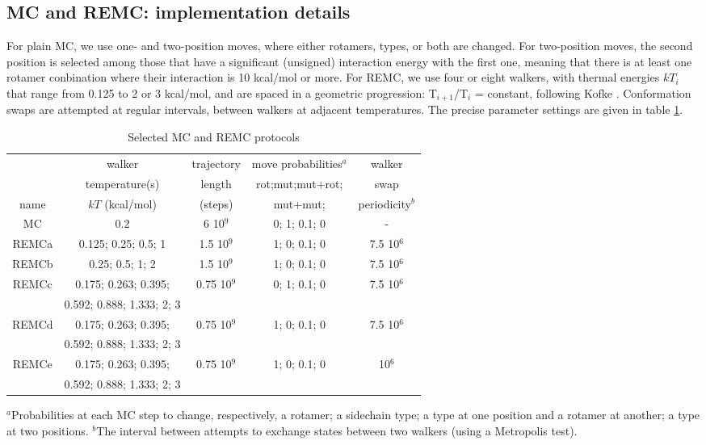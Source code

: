 \subsection{MC and REMC: implementation details}
\label{sub:REMCdetails}
For plain MC, we use one- and two-position moves, where either rotamers, types, or both are changed.
For two-position moves, the second position is selected among those that have a significant (unsigned) interaction energy with the first one, meaning that there is at least one rotamer conbination where their interaction is 10 kcal/mol or more.
For REMC, we use four or eight walkers, with thermal energies $kT_i$ that range from 0.125
to 2 or 3 kcal/mol, and are spaced in a geometric progression: T$_{i+1}$/T$_i$ = constant, following Kofke \cite{Kofke02}.
Conformation swaps are attempted at regular intervals, between walkers at adjacent temperatures.
The precise parameter settings are given in table \ref{tab:parameters}.

\begin{table}[H]                            
\caption{Selected MC and REMC protocols}
\label{tab:parameters}                      
\begin{center} \small 
\renewcommand{\arraystretch}{0.75}
\begin{tabular}{ccccc} \hline \hline  
      &  walker                   & trajectory & move probabilities$^a$ & walker     \\ 
      &  temperature(s)           & length     & rot;mut;mut+rot; & swap       \\ 
name  & $kT$ (kcal/mol)           & (steps)    & mut+mut;         & periodicity$^b$ \smallskip \\  \hline 
MC    & 0.2                       &   6 10$^9$ & 0; 1; 0.1; 0     &  -          \smallskip \\      
REMCa & 0.125; 0.25; 0.5; 1       & 1.5 10$^9$ & 1; 0; 0.1; 0     & 7.5 10$^6$  \smallskip \\   
REMCb & 0.25; 0.5; 1; 2           & 1.5 10$^9$ & 1; 0; 0.1; 0     & 7.5 10$^6$  \smallskip \\ 
REMCc & 0.175; 0.263; 0.395;      & 0.75 10$^9$& 0; 1; 0.1; 0     & 7.5 10$^6$  \\
      & 0.592; 0.888; 1.333; 2; 3 &  &  &  \smallskip \\
REMCd & 0.175; 0.263; 0.395;      &0.75 10$^9$ & 1; 0; 0.1; 0     & 7.5 10$^6$  \\
      & 0.592; 0.888; 1.333; 2; 3 &  &  &  \smallskip \\
REMCe & 0.175; 0.263; 0.395;      &0.75 10$^9$ & 1; 0; 0.1; 0     &     10$^6$  \\ 
      & 0.592; 0.888; 1.333; 2; 3  &  &  &  \smallskip \\ \hline
\end{tabular}
\end{center}
{\small \noindent $^a$Probabilities at each MC step to change, respectively, a rotamer; a sidechain type; a type at one position and a rotamer at another;
a type at two positions. $^b$The interval between attempts to exchange states
between two walkers (using a Metropolis test).
}
\end{table}

